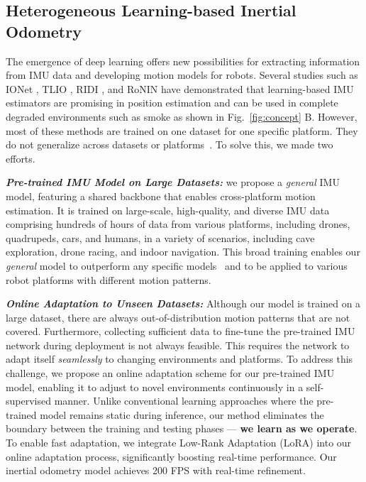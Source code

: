 \subsection{Heterogeneous Learning-based Inertial Odometry} 
The emergence of deep learning offers new possibilities for extracting information from IMU data and developing motion models for robots. 
Several studies such as IONet \cite{chen2018ionet}, TLIO \cite{liu2020tlio}, RIDI \cite{yan2018ridi}, and RoNIN \cite{chen2021rnin} have demonstrated that learning-based IMU estimators are promising in position estimation and can be used in complete degraded environments such as smoke as shown in Fig.~\ref{fig:concept} B. However, most of these methods are trained on one dataset for one specific platform. They do not generalize across datasets or platforms~\cite{buchanan2022deep}. To solve this, we made two efforts. 

\textit{\textbf{Pre-trained IMU Model on Large Datasets:}}
we propose a \textit{general} IMU model, featuring a shared backbone that enables cross-platform motion estimation. It
is trained on large-scale, high-quality, and diverse IMU data \cite{zhao2024subt} \cite{sivaprakasam2024tartandrive} comprising hundreds of hours of data from various platforms, including drones, quadrupeds, cars, and humans, in a variety of scenarios, including cave exploration, drone racing, and indoor navigation. This broad training enables our \textit{general} model to outperform any specific models~\cite{chen2018ionet,liu2020learning,chen2021rnin,yan2018ridi} and to be applied to various robot platforms with different motion patterns.

\textit{\textbf{Online Adaptation to Unseen Datasets:}} Although our model is trained on a large dataset, there are always out-of-distribution motion patterns that are not covered. 
Furthermore, collecting sufficient data to fine-tune the pre-trained IMU network during deployment is not always feasible. This requires the network to adapt itself \textit{seamlessly} to changing environments and platforms. To address this challenge, we propose an online adaptation scheme for our pre-trained IMU model, enabling it to adjust to novel environments continuously in a self-supervised manner.
Unlike conventional learning approaches where the pre-trained model remains static during inference, our method eliminates the boundary between the training and testing phases — \textbf{we learn as we operate}. To enable fast adaptation, we integrate Low-Rank Adaptation (LoRA) \cite{hu2021lora} into our online adaptation process, significantly boosting real-time performance. Our inertial odometry model achieves 200 FPS with real-time refinement.

